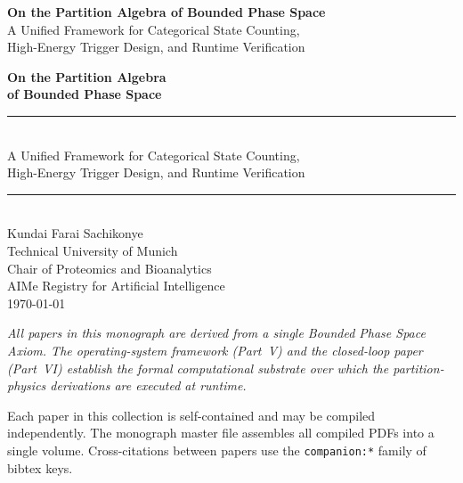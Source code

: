 \documentclass[12pt,a4paper,openany]{book}
\begin{document}
\thispagestyle{empty}
\vspace*{6cm}
\begin{center}
{\Huge\bfseries On the Partition Algebra of Bounded Phase Space}\\[1.5ex]
{\large A Unified Framework for Categorical State Counting,\\
High-Energy Trigger Design, and Runtime Verification}
\end{center}
\vfill
\clearpage

\thispagestyle{empty}
\begin{center}
\vspace*{2cm}
{\Huge\bfseries On the Partition Algebra\\[0.4ex]
of Bounded Phase Space}\\[2ex]
\rule{\textwidth}{1pt}\\[1.5ex]
{\Large A Unified Framework for Categorical State Counting,\\[0.4ex]
High-Energy Trigger Design, and Runtime Verification}\\[3ex]
\rule{\textwidth}{0.5pt}\\[3cm]
{\Large Kundai Farai Sachikonye}\\[1ex]
{\large Technical University of Munich}\\
{\large Chair of Proteomics and Bioanalytics}\\[1cm]
{\normalsize AIMe Registry for Artificial Intelligence}\\[2cm]
{\normalsize \today}
\vfill
\end{center}
\clearpage

\thispagestyle{empty}
\vspace*{\fill}
\noindent\textit{All papers in this monograph are derived from a single
Bounded Phase Space Axiom. The operating-system framework
(Part~V) and the closed-loop paper (Part~VI) establish the
formal computational substrate over which the partition-physics
derivations are executed at runtime.}
\par\vspace{2ex}
\noindent Each paper in this collection is self-contained and may be compiled
independently. The monograph master file assembles all compiled PDFs into a
single volume. Cross-citations between papers use the \texttt{companion:*}
family of bibtex keys.
\vspace*{\fill}
\clearpage
\end{document}
